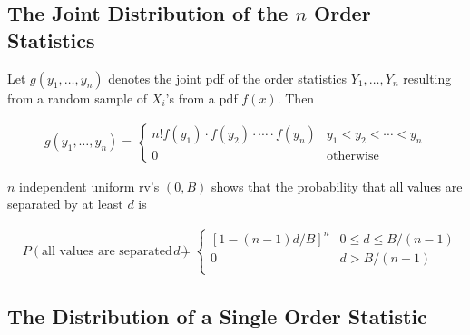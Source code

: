 \subsection{The Joint Distribution of the $n$ Order Statistics}

\begin{proposition}
    Let $g(y_1,\dots,y_n)$ denotes the joint pdf of the order statistics $Y_1,\dots,Y_n$ resulting from a random sample of $X_i$'s from a pdf $f(x)$. Then 

    \begin{align*}
        g(y_1,\dots,y_n) = \left\{\begin{array}{cl}
            n!f(y_1)\cdot f(y_2)\cdot \cdots \cdot f(y_n) & y_1<y_2<\cdots<y_n \\
            0 & \text{otherwise}
        \end{array}\right.
    \end{align*}
\end{proposition}

$n$ independent uniform rv's $(0,B)$ shows that the probability that all values are separated by at least $d$ is 

\begin{align*}
    & P(\text{all values are separated by more than }d)
    & \quad = \left\{\begin{array}{cl}
        [1-(n-1)d/B]^n & 0\leq d\leq B/(n-1) \\
        0 & d>B/(n-1) \\
    \end{array}\right.
\end{align*}

\subsection{The Distribution of a Single Order Statistic}

